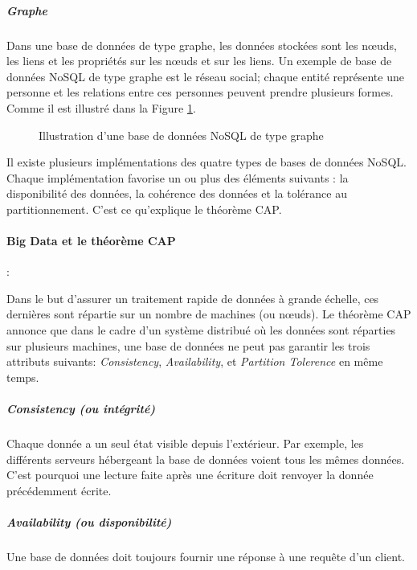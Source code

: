 	\subparagraph{Graphe} Dans une base de données de type graphe, les données stockées sont les n\oe{}uds, les liens et les propriétés sur les n\oe{}uds et sur les liens. Un exemple  de base de données NoSQL de type graphe est le réseau social; chaque entité représente une personne et les relations entre ces personnes peuvent prendre plusieurs formes. Comme il est illustré dans la Figure  	\ref{fig:graphe-nosql}.

	
	\begin{figure}[H]
		\centering
		\resizebox{\textwidth}{!}{
		
	    }
		\caption{Illustration d'une base de données NoSQL de type graphe}
		\label{fig:graphe-nosql}
	\end{figure}
	
	Il existe plusieurs implémentations des quatre types de bases de données NoSQL. Chaque implémentation favorise un ou plus des éléments suivants : la disponibilité des données, la cohérence des données et la tolérance au partitionnement.  C'est ce qu'explique le théorème CAP.	
		
		\paragraph{Big Data et le théorème  CAP} \label{par:cap-theorem}:
		
		Dans le but d'assurer un traitement rapide de données à grande échelle, ces dernières sont répartie sur un nombre de machines  (ou n\oe{}uds). Le théorème CAP annonce que dans le cadre d'un système distribué où les données sont réparties sur plusieurs machines,
		une base de données ne peut pas garantir les trois attributs suivants: \textit{Consistency}, \textit{Availability}, et \textit{Partition Tolerence}  en même temps. 
		
		
			\subparagraph{ Consistency (ou intégrité)} Chaque donnée a un seul état visible depuis l'extérieur. Par exemple, les différents serveurs hébergeant la base de données voient tous les mêmes données. C'est pourquoi une lecture faite après une écriture doit renvoyer la donnée précédemment écrite.
			
			\subparagraph{ Availability (ou disponibilité)} Une base de données doit toujours fournir une réponse à une requête d'un client.
			
			
